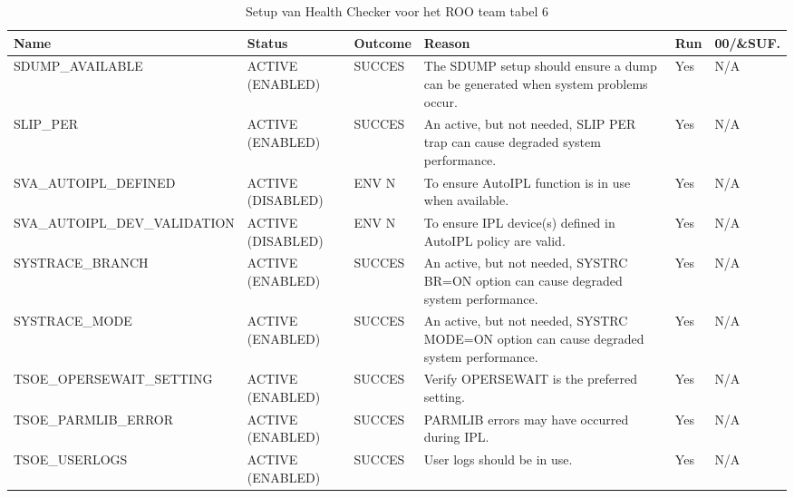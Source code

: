 \begin{landscape}
	\begin{table}[h]
		\begin{tabular}{|l|p{2.3cm}|l|p{4.5cm}|l|l|}
			\hline
			\textbf{Name}                       & \textbf{Status}   & \textbf{Outcome} & \textbf{Reason}    & \textbf{Run} &	\textbf{00/\&SUF.} \\ \hline
			SDUMP\_AVAILABLE              & ACTIVE (ENABLED)  & SUCCES & The   SDUMP setup should ensure a dump can be generated when system problems occur.         & Yes & N/A \\ \hline
			SLIP\_PER                     & ACTIVE (ENABLED)  & SUCCES & An   active, but not needed, SLIP PER trap can cause degraded system performance.           & Yes & N/A \\ \hline
			SVA\_AUTOIPL\_DEFINED         & ACTIVE (DISABLED) & ENV N  & To   ensure AutoIPL function is in use when available.                                      & Yes & N/A \\ \hline
			SVA\_AUTOIPL\_DEV\_VALIDATION & ACTIVE (DISABLED) & ENV N  & To   ensure IPL device(s) defined in AutoIPL policy are valid.                              & Yes & N/A \\ \hline
			SYSTRACE\_BRANCH              & ACTIVE (ENABLED)  & SUCCES & An   active, but not needed, SYSTRC BR=ON option can cause degraded system   performance.   & Yes & N/A \\ \hline
			SYSTRACE\_MODE                & ACTIVE (ENABLED)  & SUCCES & An   active, but not needed, SYSTRC MODE=ON option can cause degraded system   performance. & Yes & N/A \\ \hline
			TSOE\_OPERSEWAIT\_SETTING     & ACTIVE (ENABLED)  & SUCCES & Verify   OPERSEWAIT is the preferred setting.                                               & Yes & N/A \\ \hline
			TSOE\_PARMLIB\_ERROR          & ACTIVE (ENABLED)  & SUCCES & PARMLIB   errors may have occurred during IPL.                                              & Yes & N/A \\ \hline
			TSOE\_USERLOGS                & ACTIVE (ENABLED)  & SUCCES & User   logs should be in use.                                                               & Yes & N/A \\ \hline	
		\end{tabular}
		\caption[Health Checker  ROO team tabel 6]{Setup van Health Checker voor het ROO team tabel 6}
		\label{tbl:ROO Team Tabel 6}
	\end{table}
\end{landscape}

